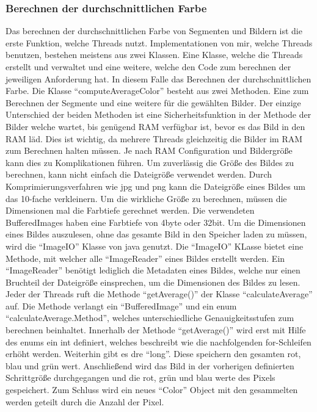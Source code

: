 \subsubsection{Berechnen der durchschnittlichen Farbe}
Das berechnen der durchschnittlichen Farbe von Segmenten und Bildern ist die erste Funktion, welche Threads nutzt. Implementationen von mir, welche Threads benutzen, bestehen meistens aus zwei Klassen. Eine Klasse, welche die Threads erstellt und verwaltet und eine weitere, welche den Code zum berechnen der jeweiligen Anforderung hat. In diesem Falle das Berechnen der durchschnittlichen Farbe. Die Klasse ``computeAverageColor'' besteht aus zwei Methoden. Eine zum Berechnen der Segmente und eine weitere für die gewählten Bilder. Der einzige Unterschied der beiden Methoden ist eine Sicherheitsfunktion in der Methode der Bilder welche wartet, bis genügend RAM verfügbar ist, bevor es das Bild in den RAM läd. Dies ist wichtig, da mehrere Threads gleichzeitig die Bilder im RAM zum Berechnen halten müssen. Je nach RAM Configuration und Bildergröße kann dies zu Komplikationen führen. Um zuverlässig die Größe des Bildes zu berechnen, kann nicht einfach die Dateigröße verwendet werden. Durch Komprimierungsverfahren wie jpg und png kann die Dateigröße eines Bildes um das 10-fache verkleinern. Um die wirkliche Größe zu berechnen, müssen die Dimensionen mal die Farbtiefe gerechnet werden. Die verwendeten BufferedImages haben eine Farbtiefe von 4byte oder 32bit. Um die Dimensionen eines Bildes auszulesen, ohne das gesamte Bild in den Speicher laden zu müssen, wird die ``ImageIO'' Klasse von java genutzt. Die ``ImageIO'' KLasse bietet eine Methode, mit welcher alle ``ImageReader'' eines Bildes erstellt werden. Ein ``ImageReader'' benötigt lediglich die Metadaten eines Bildes, welche nur einen Bruchteil der Dateigröße einsprechen, um die Dimensionen des Bildes zu lesen. Jeder der Threads ruft die Methode ``getAverage()'' der Klasse ``calculateAverage'' auf. Die Methode verlangt ein ``BufferedImage'' und ein enum ``calculateAverage.Method'', welches unterschiedliche Genauigkeitsstufen zum berechnen beinhaltet. Innerhalb der Methode ``getAverage()'' wird erst mit Hilfe des enums ein int definiert, welches beschreibt wie die nachfolgenden for-Schleifen erhöht werden. Weiterhin gibt es dre ``long''. Diese speichern den gesamten rot, blau und grün wert. Anschließend wird das Bild in der vorherigen definierten Schrittgröße durchgegangen und die rot, grün und blau werte des Pixels gespeichert. Zum Schluss wird ein neues ``Color'' Object mit den gesammelten werden geteilt durch die Anzahl der Pixel.

